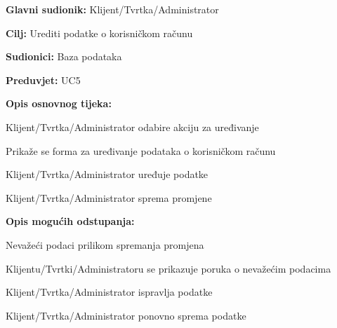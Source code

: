\noindent {}
\begin{packed_item}
	
	\item \textbf{Glavni sudionik:} Klijent/Tvrtka/Administrator
	\item  \textbf{Cilj:} Urediti podatke o korisničkom računu
	\item  \textbf{Sudionici:} Baza podataka
	\item  \textbf{Preduvjet:} UC5
	\item  \textbf{Opis osnovnog tijeka:}
	
	\item[] \begin{packed_enum}
		
		\item Klijent/Tvrtka/Administrator odabire akciju za uređivanje
		\item Prikaže se forma za uređivanje podataka o korisničkom računu
		\item Klijent/Tvrtka/Administrator uređuje podatke
		\item Klijent/Tvrtka/Administrator sprema promjene
	
	\end{packed_enum}
	
	\item  \textbf{Opis mogućih odstupanja:}
	
	\item[] \begin{packed_item}
		
		\item[6.a] Nevažeći podaci prilikom spremanja promjena
		\item[] \begin{packed_enum}
			
			\item Klijentu/Tvrtki/Administratoru se prikazuje poruka o nevažećim podacima
			\item Klijent/Tvrtka/Administrator ispravlja podatke
			\item Klijent/Tvrtka/Administrator ponovno sprema podatke
			
		\end{packed_enum}
		
	\end{packed_item}
\end{packed_item}

